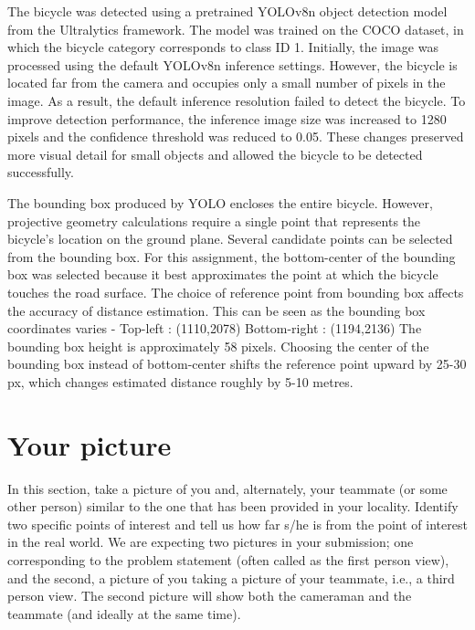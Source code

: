 \begin{studentSpace}
    The bicycle was detected using a pretrained YOLOv8n object detection model from the Ultralytics framework. The model was trained on the COCO dataset, in which the bicycle category corresponds to class ID 1. 
    Initially, the image was processed using the default YOLOv8n inference settings. However, the bicycle is located far from the camera and occupies only a small number of pixels in the image. As a result, the 
    default inference resolution failed to detect the bicycle. To improve detection performance, the inference image size was increased to 1280 pixels and the confidence threshold was reduced to 0.05. These changes 
    preserved more visual detail for small objects and allowed the bicycle to be detected successfully.

    The bounding box produced by YOLO encloses the entire bicycle. However, projective geometry calculations require a single point that represents the bicycle's location on the ground plane. 
    Several candidate points can be selected from the bounding box. For this assignment, the bottom-center of the bounding box was selected because it best approximates the point at which the bicycle touches the road surface.
    The choice of reference point from bounding box affects the accuracy of distance estimation. This can be seen as the bounding box coordinates varies -
    Top-left : (1110,2078)
    Bottom-right : (1194,2136)
    The bounding box height is approximately 58 pixels. Choosing the center of the bounding box instead of bottom-center shifts the reference point upward by 25-30 px, which changes estimated distance roughly by 5-10 metres. 
    
\end{studentSpace}


\section{Your picture}

In this section, take a picture of you and, alternately, your teammate
(or some other person) similar to the one that has been provided in
your locality. Identify two specific points of interest and tell us
how far s/he is from the point of interest in the real world. We are
expecting two pictures in your submission; one corresponding to the
problem statement (often called as the first person view), and the
second, a picture of you taking a picture of your teammate, i.e., a
third person view. The second picture will show both the cameraman and
the teammate (and ideally at the same time).

